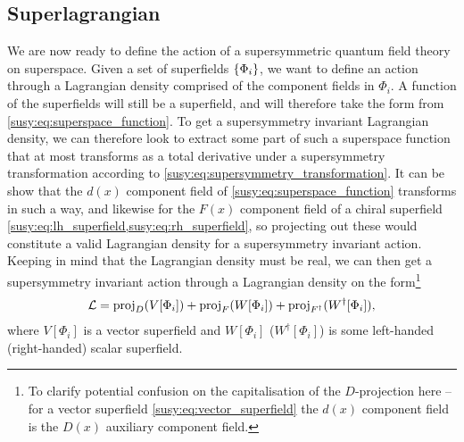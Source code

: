 \documentclass[../main.tex]{subfiles}
\begin{document}
\subsection{Superlagrangian}
We are now ready to define the action of a supersymmetric quantum field theory on superspace.
Given a set of superfields \(\left\{\Phi_i\right\}\), we want to define an action through a Lagrangian density comprised of the component fields in \(\Phi_i\).
A function of the superfields will still be a superfield, and will therefore take the form from \cref{susy:eq:superspace_function}.
To get a supersymmetry invariant Lagrangian density, we can therefore look to extract some part of such a superspace function that at most transforms as a total derivative under a supersymmetry transformation according to \cref{susy:eq:supersymmetry_transformation}.
It can be show that the \(d(x)\) component field of \cref{susy:eq:superspace_function} transforms in such a way, and likewise for the \(F(x)\) component field of a chiral superfield \cref{susy:eq:lh_superfield,susy:eq:rh_superfield}, so projecting out these would constitute a valid Lagrangian density for a supersymmetry invariant action.
Keeping in mind that the Lagrangian density must be real, we can then get a supersymmetry invariant action through a Lagrangian density on the form\footnote{To clarify potential confusion on the capitalisation of the \(D\)-projection here -- for a vector superfield \cref{susy:eq:vector_superfield} the \(d(x)\) component field is the \(D(x)\) auxiliary component field.}
\begin{align}
  \label{susy:eq:projection_lagragnian}
  \mathcal{L} = \operatorname{proj}_D (V[\Phi_i]) + \operatorname{proj}_F (W[\Phi_i]) + \operatorname{proj}_{F^\dagger}(W^\dagger[\Phi_i]),
\end{align}
where \(V[\Phi_i]\) is a vector superfield and \(W[\Phi_i]\) (\(W^\dagger[\Phi_i]\)) is some left-handed (right-handed) scalar superfield.
\end{document}
